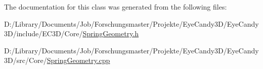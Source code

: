 The documentation for this class was generated from the following files\+:\begin{DoxyCompactItemize}
\item 
D\+:/\+Library/\+Documents/\+Job/\+Forschungsmaster/\+Projekte/\+Eye\+Candy3\+D/\+Eye\+Candy3\+D/include/\+E\+C3\+D/\+Core/\mbox{\hyperlink{_spring_geometry_8h}{Spring\+Geometry.\+h}}\item 
D\+:/\+Library/\+Documents/\+Job/\+Forschungsmaster/\+Projekte/\+Eye\+Candy3\+D/\+Eye\+Candy3\+D/src/\+Core/\mbox{\hyperlink{_spring_geometry_8cpp}{Spring\+Geometry.\+cpp}}\end{DoxyCompactItemize}

